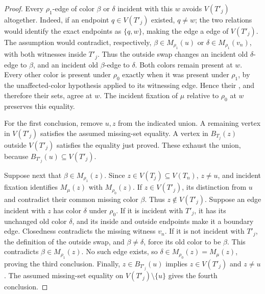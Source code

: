 \begin{proof}
Every \(\rho_1\)-edge of color \(\beta\) or \(\delta\) incident with
this \(w\) avoids \(V(T'_j)\) altogether.  Indeed, if an endpoint
\(q\in V(T'_j)\) existed, \(q\ne w\); the two
 relations would identify
the exact endpoints as \(\{q,w\}\), making the edge a
 edge of \(V(T'_j)\).
The  assumption would contradict,
respectively, \(\beta\in M_{\rho_1}(u)\)
or \(\delta\in M_{\rho_1}(v_n)\), with both witnesses inside \(T'_j\).
Thus the outside swap changes an incident old \(\delta\)-edge to
\(\beta\), and an incident old \(\beta\)-edge to \(\delta\).
Both colors remain present at \(w\).  Every other color is present
under \(\rho_0\) exactly when it was present under \(\rho_1\), by
the unaffected-color hypothesis applied to its witnessing edge.
Hence their , and therefore their
sets, agree at \(w\).  The incident fixation of \(\mu\) relative to
\(\rho_0\) at \(w\) preserves this equality.

For the first conclusion, remove \(u,z\) from the indicated union.
A remaining vertex in \(V(T'_j)\) satisfies the assumed missing-set
equality.  A vertex in \(B_{T_j}(z)\) outside \(V(T'_j)\) satisfies
the equality just proved.  These exhaust the union, because
\(B_{T'_j}(u)\subseteq V(T'_j)\).

Suppose next that \(\beta\in M_{\rho_1}(z)\).
Since \(z\in V(T_j)\subseteq V(T_n)\), \(z\ne u\), and incident
fixation identifies \(M_\mu(z)\) with \(M_{\rho_0}(z)\).
If \(z\in V(T'_j)\), its distinction from \(u\) and
 contradict their common missing
color \(\beta\).  Thus \(z\notin V(T'_j)\).
Suppose an edge incident with \(z\) has color \(\delta\) under \(\rho_0\).
If it is incident with \(T'_j\), it has its unchanged old color
\(\delta\), and its inside and outside endpoints make it a boundary
edge.  Closedness contradicts the missing witness \(v_n\).
If it is not incident with \(T'_j\), the definition of the outside
swap, and \(\beta\ne\delta\), force its old color to be \(\beta\).
This contradicts \(\beta\in M_{\rho_1}(z)\).
No such edge exists, so \(\delta\in M_{\rho_0}(z)=M_\mu(z)\),
proving the third conclusion.
Finally, \(z\in B_{T'_j}(u)\) implies \(z\in V(T'_j)\) and \(z\ne u\).
The assumed missing-set equality on \(V(T'_j)\setminus\{u\}\)
gives the fourth conclusion.
\end{proof}
